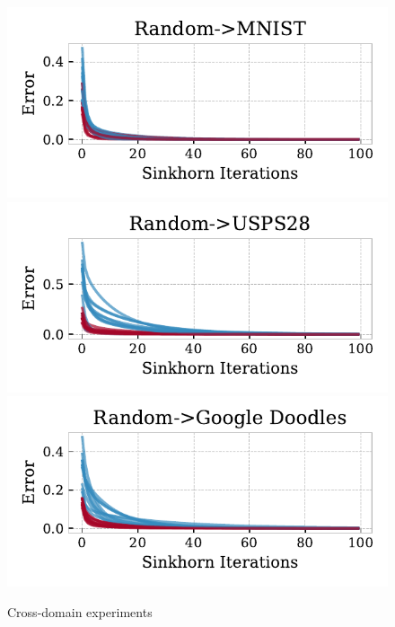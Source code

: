 \documentclass{article}
\begin{document}
\begin{figure}[!t]
    \includegraphics[width=.32\linewidth]{fig/cross_domain/errs_random_mnist.pdf}
    \includegraphics[width=.32\linewidth]{fig/cross_domain/errs_random_usps28.pdf}
    \includegraphics[width=.32\linewidth]{fig/cross_domain/errs_random_doodles.pdf}

    \label{fig:cross_domain}
    \caption{Cross-domain experiments}
\end{figure}
\end{document}
